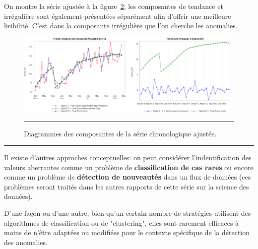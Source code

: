 \begin{Exemple}
\begin{figure}[t]
\label{fig:diff}
\end{figure}
On montre la série ajustée \`a la figure~\ref{fig:adjusted}; les composantes de tendance et irrégulière sont également pr\'esent\'ees séparément afin d'offrir une meilleure lisibilité. C'est dans la composante irréguli\`ere que l'on cherche les anomalies. 
\begin{figure}[t]
\centering
\includegraphics[width=0.98\textwidth]{Images/adjustedplot.png}
\caption{\small Diagrammes des composantes de la série chronologique ajustée.}\hrule
\label{fig:adjusted}
\end{figure}
\end{Exemple}
\begin{center}
    \rule{0.25\textwidth}{.4pt}
\end{center}
Il existe d'autres approches conceptuelles: on peut considérer l'indentification des valeurs aberrantes comme un problème de \textbf{classification de cas rares} ou encore comme un problème de \textbf{d\'etection de nouveaut\'es} dans un  flux de données (ces problèmes seront traités dans les autres rapports de cette série sur la science des donn\'ees). \par D'une façon ou d'une autre, bien qu'un certain nombre de stratégies utilisent des algorithmes de classification ou de "clustering", elles sont rarement efficaces à moins de n'\^etre adaptées ou modifiées pour le contexte sp\'ecifique de la détection des anomalies.  
